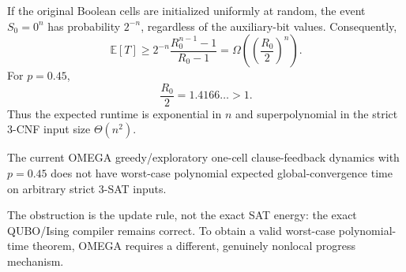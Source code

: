 If the original Boolean cells are initialized uniformly at random, the event
$S_0=0^n$ has probability $2^{-n}$, regardless of the auxiliary-bit values.
Consequently,
\begin{equation}
\mathbb E[T]
\ge
2^{-n}
\frac{R_0^{n-1}-1}{R_0-1}
=
\Omega\!\left(
\left(\frac{R_0}{2}\right)^n
\right).
\end{equation}
For $p=0.45$,
\begin{equation}
\frac{R_0}{2}=1.4166\ldots>1.
\end{equation}
Thus the expected runtime is exponential in $n$ and superpolynomial in the
strict 3-CNF input size $\Theta(n^2)$.

\begin{theorem}
The current OMEGA greedy/exploratory one-cell clause-feedback dynamics with
$p=0.45$ does not have worst-case polynomial expected global-convergence time
on arbitrary strict 3-SAT inputs.
\end{theorem}

The obstruction is the update rule, not the exact SAT energy: the exact
QUBO/Ising compiler remains correct.  To obtain a valid worst-case
polynomial-time theorem, OMEGA requires a different, genuinely nonlocal
progress mechanism.
